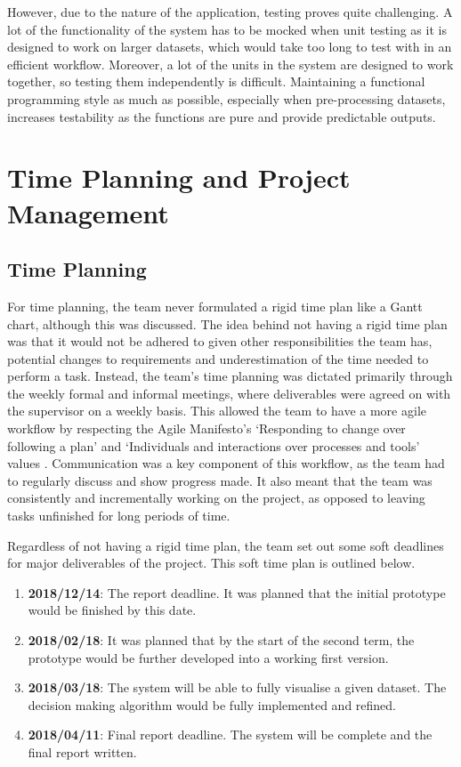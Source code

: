 \documentclass[a4paper,titlepage]{article}
\begin{document}
However, due to the nature of the application, testing proves quite challenging.
A lot of the functionality of the system has to be mocked when unit testing as it is designed to work on larger datasets, which would take too long to test with in an efficient workflow.
Moreover, a lot of the units in the system are designed to work together, so testing them independently is difficult.
Maintaining a functional programming style as much as possible, especially when pre-processing datasets, increases testability as the functions are pure and provide predictable outputs.

\section{Time Planning and Project Management}
\subsection{Time Planning\label{timeplanning}}
For time planning, the team never formulated a rigid time plan like a Gantt chart, although this was discussed.
The idea behind not having a rigid time plan was that it would not be adhered to given other responsibilities the team has, potential changes to requirements and underestimation of the time needed to perform a task.
Instead, the team's time planning was dictated primarily through the weekly formal and informal meetings, where deliverables were agreed on with the supervisor on a weekly basis.
This allowed the team to have a more agile workflow by respecting the Agile Manifesto's `Responding to change over following a plan' and `Individuals and interactions over processes and tools' values \cite{agilemanifesto}.
Communication was a key component of this workflow, as the team had to regularly discuss and show progress made.
It also meant that the team was consistently and incrementally working on the project, as opposed to leaving tasks unfinished for long periods of time.

Regardless of not having a rigid time plan, the team set out some soft deadlines for major deliverables of the project.
This soft time plan is outlined below.

\begin{enumerate}
  \item \textbf{2018/12/14}: The report deadline. It was planned that the initial prototype would be finished by this date.
  \item \textbf{2018/02/18}: It was planned that by the start of the second term, the prototype would be further developed into a working first version.
  \item \textbf{2018/03/18}: The system will be able to fully visualise a given dataset. The decision making algorithm would be fully implemented and refined.
  \item \textbf{2018/04/11}: Final report deadline. The system will be complete and the final report written.
\end{enumerate}
\end{document}
